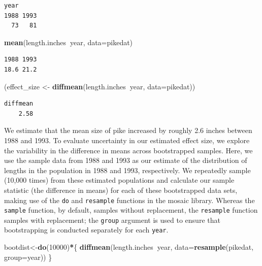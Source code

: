 \documentclass[fleqn,10pt]{wlpeerj} %
\newenvironment{Shaded}{\begin{snugshade}}{\end{snugshade}}
\newcommand{\DataTypeTok}[1]{\textcolor[rgb]{0.13,0.29,0.53}{#1}}
\newcommand{\DecValTok}[1]{\textcolor[rgb]{0.00,0.00,0.81}{#1}}
\newcommand{\KeywordTok}[1]{\textcolor[rgb]{0.13,0.29,0.53}{\textbf{#1}}}
\newcommand{\NormalTok}[1]{#1}
\newcommand{\OperatorTok}[1]{\textcolor[rgb]{0.81,0.36,0.00}{\textbf{#1}}}
\newcommand{\StringTok}[1]{\textcolor[rgb]{0.31,0.60,0.02}{#1}}
\begin{document}
\begin{verbatim}
year
1988 1993 
  73   81 
\end{verbatim}

\begin{Shaded}
\begin{Highlighting}[]
\KeywordTok{mean}\NormalTok{(length.inches}\OperatorTok{~}\NormalTok{year, }\DataTypeTok{data=}\NormalTok{pikedat)}
\end{Highlighting}
\end{Shaded}

\begin{verbatim}
1988 1993 
18.6 21.2 
\end{verbatim}

\begin{Shaded}
\begin{Highlighting}[]
\NormalTok{(effect_size <-}\StringTok{ }\KeywordTok{diffmean}\NormalTok{(length.inches}\OperatorTok{~}\NormalTok{year, }\DataTypeTok{data=}\NormalTok{pikedat))}
\end{Highlighting}
\end{Shaded}

\begin{verbatim}
diffmean 
    2.58 
\end{verbatim}

We estimate that the mean size of pike increased by roughly 2.6 inches between 1988 and 1993. To evaluate uncertainty in our estimated effect size, we explore the variability in the difference in means across bootstrapped samples. Here, we use the sample data from 1988 and 1993 as our estimate of the distribution of lengths in the population in 1988 and 1993, respectively. We repeatedly sample (10,000 times) from these estimated populations and calculate our sample statistic (the difference in means) for each of these bootstrapped data sets, making use of the \texttt{do} and \texttt{resample} functions in the mosaic library. Whereas the \texttt{sample} function, by default, samples without replacement, the \texttt{resample} function samples with replacement; the \texttt{group} argument is used to ensure that bootstrapping is conducted separately for each \texttt{year}.

\begin{Shaded}
\begin{Highlighting}[]
\NormalTok{bootdist<-}\KeywordTok{do}\NormalTok{(}\DecValTok{10000}\NormalTok{)}\OperatorTok{*}\NormalTok{\{}
  \KeywordTok{diffmean}\NormalTok{(length.inches}\OperatorTok{~}\NormalTok{year, }\DataTypeTok{data=}\KeywordTok{resample}\NormalTok{(pikedat, }\DataTypeTok{group=}\NormalTok{year))}
\NormalTok{\}}
\end{Highlighting}
\end{Shaded}
\end{document}
